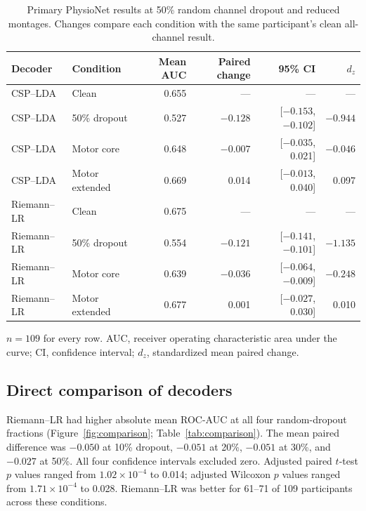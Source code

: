 \documentclass[11pt]{article}
\begin{document}
\begin{table}[t]
\centering
\caption{Primary PhysioNet results at 50\% random channel dropout and reduced montages. Changes compare each condition with the same participant's clean all-channel result.}
\label{tab:main}
\begin{threeparttable}
\small
\begin{tabular}{llrrrr}
\toprule
Decoder & Condition & Mean AUC & Paired change & 95\% CI & $d_z$ \\
\midrule
CSP--LDA & Clean & 0.655 & --- & --- & --- \\
CSP--LDA & 50\% dropout & 0.527 & $-0.128$ & [$-0.153$, $-0.102$] & $-0.944$ \\
CSP--LDA & Motor core & 0.648 & $-0.007$ & [$-0.035$, 0.021] & $-0.046$ \\
CSP--LDA & Motor extended & 0.669 & 0.014 & [$-0.013$, 0.040] & 0.097 \\
\addlinespace
Riemann--LR & Clean & 0.675 & --- & --- & --- \\
Riemann--LR & 50\% dropout & 0.554 & $-0.121$ & [$-0.141$, $-0.101$] & $-1.135$ \\
Riemann--LR & Motor core & 0.639 & $-0.036$ & [$-0.064$, $-0.009$] & $-0.248$ \\
Riemann--LR & Motor extended & 0.677 & 0.001 & [$-0.027$, 0.030] & 0.010 \\
\bottomrule
\end{tabular}
\begin{tablenotes}\footnotesize
\item $n=109$ for every row. AUC, receiver operating characteristic area under the curve; CI, confidence interval; $d_z$, standardized mean paired change.
\end{tablenotes}
\end{threeparttable}
\end{table}

\subsection{Direct comparison of decoders}
Riemann--LR had higher absolute mean ROC-AUC at all four random-dropout fractions (Figure~\ref{fig:comparison}; Table~\ref{tab:comparison}). The mean paired difference was $-0.050$ at 10\% dropout, $-0.051$ at 20\%, $-0.051$ at 30\%, and $-0.027$ at 50\%. All four confidence intervals excluded zero. Adjusted paired $t$-test $p$ values ranged from $1.02\times10^{-4}$ to 0.014; adjusted Wilcoxon $p$ values ranged from $1.71\times10^{-4}$ to 0.028. Riemann--LR was better for 61--71 of 109 participants across these conditions.
\end{document}
